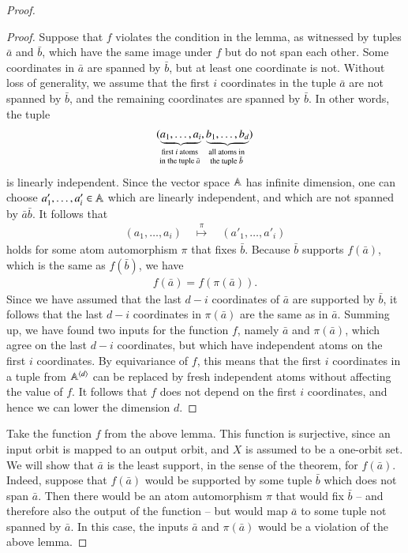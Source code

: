 \begin{proof}
\begin{proof}
	Suppose that $f$ violates the condition in the lemma, as witnessed by tuples $\bar a$ and $\bar b$,
 which have the same image under $f$ but do not span each other. Some coordinates in $\bar a$ are spanned by $\bar b$, but at least one coordinate is not.  Without loss of generality, we assume that the first $i$ coordinates in the tuple $\bar a$ are not spanned by $\bar b$, and the remaining coordinates are spanned by $\bar b$. In other words, the tuple
		\begin{align*}
			(\myunderbrace{a_1,\ldots,a_i}{first $i$ atoms \\ in the tuple $\bar a$}, 
			\myunderbrace{b_1,\ldots,b_d}{all atoms in\\ the tuple $\bar b$})
		\end{align*}
is linearly independent. Since the vector space $\mathbb A$ has infinite dimension, one can choose $a'_1,\ldots,a'_i \in \mathbb A$ which are linearly independent, and which are not spanned by $\bar a \bar b$. It follows that 
\begin{align*}
(a_1,\ldots,a_i) 
\quad \stackrel \pi \mapsto \quad 
(a'_1,\ldots,a'_i)
\end{align*}
holds for some atom automorphism $\pi$ that fixes $\bar b$. Because $\bar b$ supports $f(\bar a)$, which is the same as $f(\bar b)$, we have 
\begin{align*}
	f(\bar a) = f(\pi(\bar a)).
	\end{align*}
Since we have assumed that the  last $d-i$ coordinates of $\bar a$ are  supported by $\bar b$, it follows that the last $d-i$ coordinates in $\pi(\bar a)$ are the same as in $\bar a$. Summing up, we have found two inputs for the function $f$, namely $\bar a$ and $\pi(\bar a)$, which agree on the last $d-i$ coordinates, but which have independent atoms on the first $i$ coordinates. 
By equivariance of $f$, this means that the first $i$ coordinates in a tuple from $\mathbb A^{\langle d \rangle}$ can be replaced by fresh independent atoms without affecting the value of $f$. It follows that $f$ does not depend on the first $i$ coordinates, and hence we can lower the dimension $d$.
\end{proof}

Take the function $f$ from the above lemma. This function is surjective, since an input orbit is mapped to an output orbit, and $X$ is assumed to be a one-orbit set. We will show that  $\bar a$ is the least support, in the sense of the theorem, for $f(\bar a)$. Indeed, suppose that $f(\bar a)$ would be supported by some tuple $\bar b$ which does not span $\bar a$. Then there would be an atom automorphism $\pi$ that would fix $\bar b$ -- and therefore also the output of the function -- but would map $\bar a$ to some tuple not spanned by $\bar a$. In this case, the inputs $\bar a$ and $\pi(\bar a)$ would be a violation of the above lemma.
	\end{proof}

